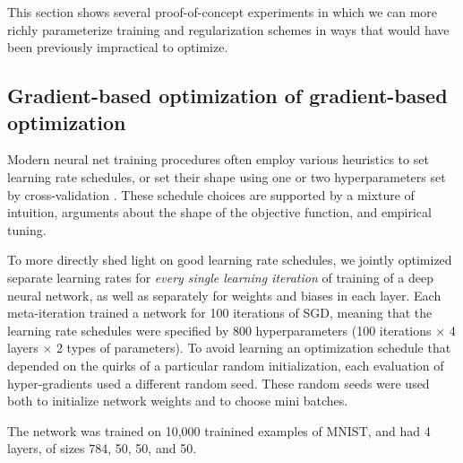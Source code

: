 \documentclass{article}
\begin{document}
This section shows several proof-of-concept experiments in which we can more richly parameterize training and regularization schemes in ways that would have been previously impractical to optimize.



\subsection{Gradient-based optimization of gradient-based optimization}
\label{sec:schedule experiments}
Modern neural net training procedures often employ various heuristics to set learning rate schedules, or set their shape using one or two hyperparameters set by cross-validation \cite{lecun1989backpropagation, dahl2014multi, sutskever2013importance}.
These schedule choices are supported by a mixture of intuition, arguments about the shape of the objective function, and empirical tuning.

To more directly shed light on good learning rate schedules, we jointly optimized separate learning rates for \emph{every single learning iteration} of training of a deep neural network, as well as separately for weights and biases in each layer.
Each meta-iteration trained a network for 100 iterations of SGD, meaning that the learning rate schedules were specified by 800 hyperparameters (100 iterations $\times$ 4 layers $\times$ 2 types of parameters).
To avoid learning an optimization schedule that depended on the quirks of a particular random initialization, each evaluation of hyper-gradients used a different random seed.
These random seeds were used both to initialize network weights and to choose mini batches.

The network was trained on 10,000 trainined examples of MNIST, and had 4 layers, of sizes 784, 50, 50, and 50.
\end{document}
